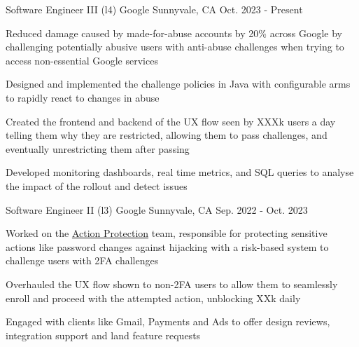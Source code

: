 
\hypersetup{
    colorlinks=true,
    linkcolor=blue,
    filecolor=magenta,
    urlcolor=awesome,
}



\begin{cventries}

  \cventry
	{Software Engineer III (l4)}
    {Google}
    {Sunnyvale, CA}
    {Oct. 2023 - Present}
    {
      \begin{cvitems}
        \item Reduced damage caused by made-for-abuse accounts by 20\% across Google by challenging potentially abusive users with anti-abuse challenges when trying to access non-essential Google services
		\item Designed and implemented the challenge policies in Java with configurable arms to rapidly react to changes in abuse
		\item Created the frontend and backend of the UX flow seen by XXXk users a day telling them why they are restricted, allowing them to pass challenges, and eventually unrestricting them after passing
		\item Developed monitoring dashboards, real time metrics, and SQL queries to analyse the impact of the rollout and detect issues
      \end{cvitems}
    }

  \cventry
	{Software Engineer II (l3)}
    {Google}
    {Sunnyvale, CA}
    {Sep. 2022 - Oct. 2023}
    {
      \begin{cvitems}
	  \item Worked on the \href{https://support.google.com/accounts/answer/7162782}{Action Protection} team, responsible for protecting sensitive actions like password changes against hijacking with a risk-based system to challenge users with 2FA challenges
	  \item Overhauled the UX flow shown to non-2FA users to allow them to seamlessly enroll and proceed with the attempted action, unblocking XXk daily
	  \item Engaged with clients like Gmail, Payments and Ads to offer design reviews, integration support and land feature requests
      \end{cvitems}
    }


\end{cventries}
